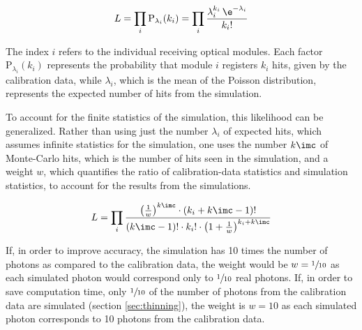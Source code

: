\begin{equation}
  L = \prod_{i} \text{P}_{\lambda_i}(k_i) = \prod_{i} \frac{\lambda_i^{k_i}\,\e^{-\lambda_i}}{k_i !}
\end{equation}

The index $i$ refers to the individual receiving optical modules. Each factor $\text{P}_{\lambda_i}(k_i)$ represents the probability that module $i$ registers $k_i$ hits, given by the calibration data, while $\lambda_i$, which is the mean of the Poisson distribution, represents the expected number of hits from the simulation.

%
%

To account for the finite statistics of the simulation, this likelihood can be generalized. Rather than using just the number $\lambda_i$ of expected hits, which assumes infinite statistics for the simulation, one uses the number $k\imc$ of Monte-Carlo hits, which is the number of hits seen in the simulation, and a weight $w$, which quantifies the ratio of calibration-data statistics and simulation statistics, to account for the results from the simulations. \cite[equation 21]{Gluesenkamp2018}

\begin{equation}
  L = \prod_{i} \frac%
    {\left(\frac{1}{w}\right)^{k\imc} \cdot \left(k_i + k\imc - 1\right)!}%
    {(k\imc - 1)! \cdot k_i! \cdot \left( 1 + \frac{1}{w} \right)^{k_i + k\imc}}
\end{equation}

If, in order to improve accuracy, the simulation has 10 times the number of photons as compared to the calibration data, the weight would be $w=\sfrac{1}{10}$ as each simulated photon would correspond only to $\sfrac{1}{10}$ real photons. If, in order to save computation time, only $\sfrac{1}{10}$ of the number of photons from the calibration data are simulated (section \ref{sec:thinning}), the weight is $w=10$ as each simulated photon corresponds to 10 photons from the calibration data.


